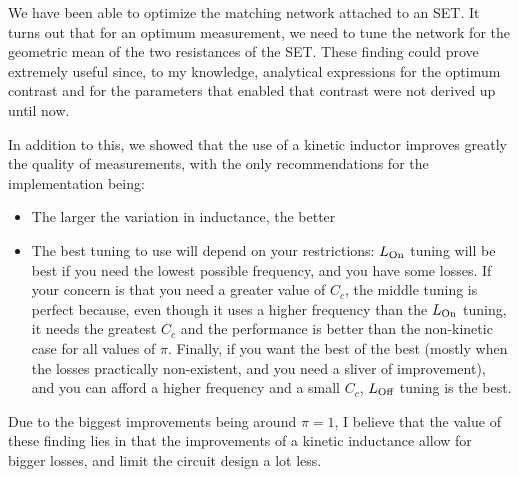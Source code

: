 \documentclass[../main.tex]{subfiles}
\begin{document}
We have been able to optimize the matching network attached to an SET. It turns
out that for an optimum measurement, we need to tune the network for the
geometric mean of the two resistances of the SET. These finding could prove
extremely useful since, to my knowledge, analytical expressions for the
optimum contrast and for the parameters that enabled that contrast were not
derived up until now.

In addition to this, we showed that the use of a kinetic inductor improves
greatly the quality of measurements, with the only recommendations for the
implementation being:
\begin{itemize}
    \item The larger the variation in inductance, the better
    \item The best tuning to use will depend on your restrictions:
        \(L_{\text{On}}\) tuning will be best if you need the lowest possible frequency,
        and you have some losses. If your concern is that you need a greater
        value of \(C_{c}\), the middle tuning is perfect because, even though
        it uses a higher frequency than the \(L_{\text{On}}\) tuning, it needs the
        greatest \(C_{c}\) and the performance is better than the non-kinetic
        case for all values of \(\pi\). Finally, if you want the best of the
        best (mostly when the losses practically non-existent, and
        you need a sliver of improvement), and you can afford a higher frequency
        and a small \(C_{c}\), \(L_{\text{Off}}\) tuning is the best.
\end{itemize}
Due to the biggest improvements being around \(\pi = 1\), I believe that
the value of these finding lies in that the improvements of a kinetic inductance
allow for bigger losses, and limit the circuit design a lot less.
\end{document}
